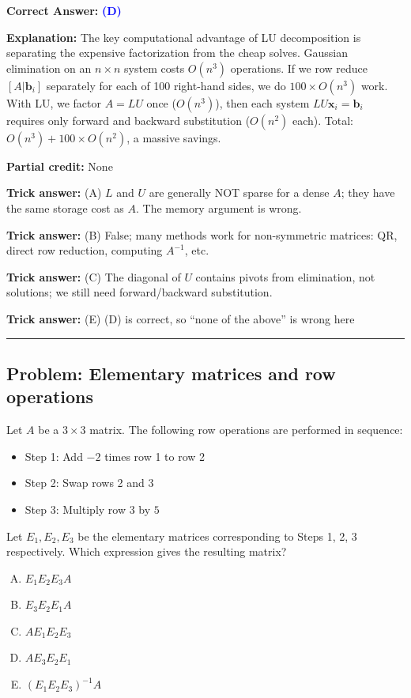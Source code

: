 \documentclass[12pt]{amsart}
\newcommand{\divider}{
  \vspace{-1em}
  \noindent
  \raisebox{-0.15ex}{\textbullet}%
  \hspace{0.5em}%
  \rule[0.5ex]{0.95\textwidth}{1.0pt}%
  \hspace{0.5em}%
  \raisebox{-0.15ex}{\textbullet}%
  \vspace{0em}
}
\begin{document}
\textbf{Correct Answer:} \textcolor{blue}{\textbf{(D)}}

\textbf{Explanation:} The key computational advantage of LU decomposition is separating the expensive factorization from the cheap solves. Gaussian elimination on an $n \times n$ system costs $O(n^3)$ operations. If we row reduce $[A | \mathbf{b}_i]$ separately for each of 100 right-hand sides, we do $100 \times O(n^3)$ work. With LU, we factor $A = LU$ once ($O(n^3)$), then each system $LU\mathbf{x}_i = \mathbf{b}_i$ requires only forward and backward substitution ($O(n^2)$ each). Total: $O(n^3) + 100 \times O(n^2)$, a massive savings.

\textbf{Partial credit:} None

\textbf{Trick answer:} (A) $L$ and $U$ are generally NOT sparse for a dense $A$; they have the same storage cost as $A$. The memory argument is wrong.

\textbf{Trick answer:} (B) False; many methods work for non-symmetric matrices: QR, direct row reduction, computing $A^{-1}$, etc.

\textbf{Trick answer:} (C) The diagonal of $U$ contains pivots from elimination, not solutions; we still need forward/backward substitution.

\textbf{Trick answer:} (E) (D) is correct, so ``none of the above'' is wrong here

\divider

\subsection*{Problem: Elementary matrices and row operations}

Let $A$ be a $3 \times 3$ matrix. The following row operations are performed in sequence:
\begin{itemize}
\item Step 1: Add $-2$ times row 1 to row 2
\item Step 2: Swap rows 2 and 3
\item Step 3: Multiply row 3 by $5$
\end{itemize}
Let $E_1, E_2, E_3$ be the elementary matrices corresponding to Steps 1, 2, 3 respectively. Which expression gives the resulting matrix?

\begin{enumerate}[(A)]
\item $E_1 E_2 E_3 A$
\item $E_3 E_2 E_1 A$
\item $A E_1 E_2 E_3$
\item $A E_3 E_2 E_1$
\item $(E_1 E_2 E_3)^{-1} A$
\end{enumerate}
\end{document}

